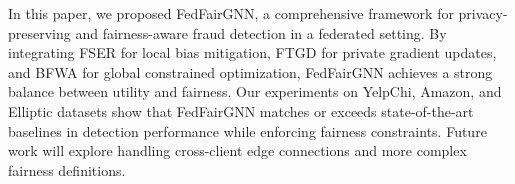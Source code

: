 In this paper, we proposed FedFairGNN, a comprehensive framework for privacy-preserving and fairness-aware fraud detection in a federated setting. By integrating FSER for local bias mitigation, FTGD for private gradient updates, and BFWA for global constrained optimization, FedFairGNN achieves a strong balance between utility and fairness. Our experiments on YelpChi, Amazon, and Elliptic datasets show that FedFairGNN matches or exceeds state-of-the-art baselines in detection performance while enforcing fairness constraints. Future work will explore handling cross-client edge connections and more complex fairness definitions.
